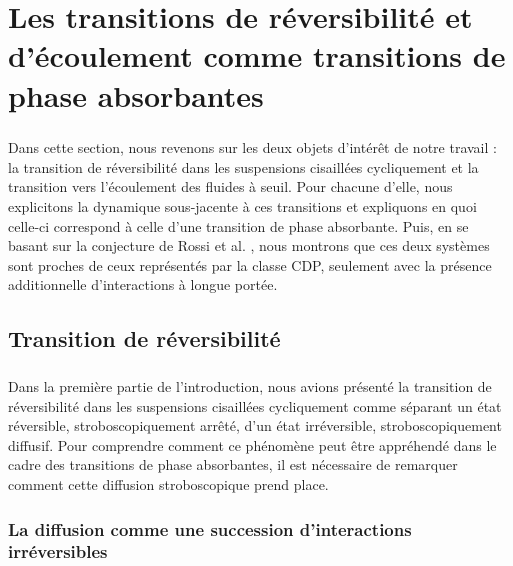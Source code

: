 \section[Les transitions de réversibilité et d'écoulement comme transitions de phase \\ absorbantes]{Les transitions de réversibilité et d'écoulement comme transitions de phase absorbantes}

\subparagraph{}Dans cette section, nous revenons sur les deux objets d'intérêt de notre travail : la transition de réversibilité dans les suspensions cisaillées cycliquement et la transition vers l'écoulement des fluides à seuil. Pour chacune d'elle, nous explicitons la dynamique sous-jacente à ces transitions et expliquons en quoi celle-ci correspond à celle d'une transition de phase absorbante. Puis, en se basant sur la conjecture de Rossi et al. \cite{rossi_universality_2000}, nous montrons que ces deux systèmes sont proches de ceux représentés par la classe CDP, seulement avec la présence additionnelle d'interactions à longue portée.

\subsection{Transition de réversibilité}

\subparagraph{}Dans la première partie de l'introduction, nous avions présenté la transition de réversibilité dans les suspensions cisaillées cycliquement comme séparant un état réversible, stroboscopiquement arrêté, d'un état irréversible, stroboscopiquement diffusif. Pour comprendre comment ce phénomène peut être appréhendé dans le cadre des transitions de phase absorbantes, il est nécessaire de remarquer comment cette diffusion stroboscopique prend place.

\subsubsection{La diffusion comme une succession d'interactions irréversibles}


